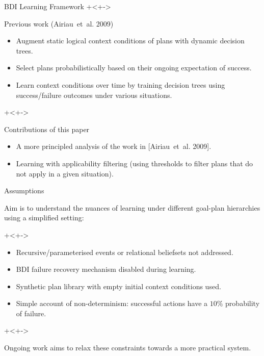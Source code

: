 \documentclass[]{beamer}
\begin{document}
\begin{frame}{BDI Learning Framework}
\onslide+<+->
\begin{block}{Previous work (Airiau~et~al. 2009)}
\begin{itemize}
\item<+-> Augment static logical context conditions of plans with dynamic \alert{decision trees}.
\item<+-> Select plans \alert{probabilistically} based on their ongoing expectation of success.
\item<+-> \alert{Learn context conditions} over time by training decision trees using success/failure outcomes under various situations.
\end{itemize}
\end{block}
\onslide+<+->
\begin{block}{Contributions of this paper}
\begin{itemize}
\item<+-> A more principled analysis of the work in [Airiau~et~al. 2009].
\item<+-> Learning with \alert{applicability filtering} (using thresholds to filter plans that do not apply in a given situation).
\end{itemize}
\end{block}
\end{frame}

\begin{frame}{Assumptions}
\begin{block}{}
Aim is to understand the nuances of learning under different goal-plan hierarchies using a simplified setting:
\end{block}
\onslide+<+->
\begin{block}{}
\begin{itemize}
\item<+-> Recursive/parameterised events or relational beliefsets not addressed.
\item<+-> BDI failure recovery mechanism disabled during learning.
\item<+-> Synthetic plan library with empty initial context conditions used.
\item<+-> Simple account of non-determinism: successful actions have a $10\%$ probability of failure.
\end{itemize}
\end{block}
\onslide+<+->
\begin{block}{}
Ongoing work aims to relax these constraints towards a more practical system.
\end{block}


\end{frame}
\end{document}
